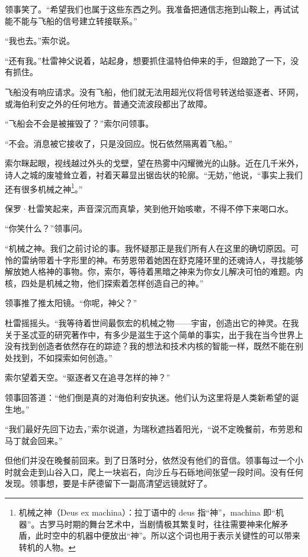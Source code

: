 \documentclass[AutoFakeBold=true]{book}
\begin{document}
领事笑了。``希望我们也属于这些东西之列。我准备把通信志拖到山鞍上，再试试能不能与飞船的信号建立转接联系。''

``我也去。''索尔说。

``还有我。''杜雷神父说着，站起身，想要抓住温特伯伸来的手，但踉跄了一下，没有抓住。

\vspace*{1em}

飞船没有响应请求。没有飞船，他们就无法用超光仪将信号转送给驱逐者、环网，或海伯利安之外的任何地方。普通交流波段都出了故障。

``飞船会不会是被摧毁了？''索尔问领事。

``不会。消息被它接收了，只是没回应。悦石依然隔离着飞船。''

索尔眯起眼，视线越过外头的戈壁，望在热雾中闪耀微光的山脉。近在几千米外，诗人之城的废墟耸立着，衬着天幕显出锯齿状的轮廓。``无妨，''他说，``事实上我们还有很多{\kaishu 机械之神}\footnote{机械之神（Deus ex machina）：拉丁语中的 deus 指``神''，machina 即``机器''。古罗马时期的舞台艺术中，当剧情极其繁复时，往往需要神来化解矛盾，此时空中的机器中便放出``神''。所以这个词也用于表示关键性的可以带来转机的人物。}。''

保罗·杜雷笑起来，声音深沉而真挚，笑到他开始咳嗽，不得不停下来喝口水。

``你笑什么？''领事问。

``{\kaishu 机械之神}。我们之前讨论的事。我怀疑那正是我们所有人在这里的确切原因。可怜的雷纳带着十字形里的神。布劳恩带着她困在舒克隆环里的还魂诗人，寻找能够解放她人格神的事物。你，索尔，等待着黑暗之神来为你女儿解决可怕的难题。内核，四处是机械之物，他们探索着怎样创造自己的神。''

领事推了推太阳镜。``你呢，神父？''

杜雷摇摇头。``我等待着世间最恢宏的机械之物——宇宙，创造出它的神灵。在我关于圣忒亚的研究著作中，有多少是滋生于这个简单的事实，出于我在当今世界上没有找到创造者依然存在的踪迹？我的想法和技术内核的智能一样，既然不能在别处找到，不如探索如何创造。''

索尔望着天空。``驱逐者又在追寻怎样的神？''

领事回答道：``他们倒是真的对海伯利安执迷。他们认为这里将是人类新希望的诞生地。''

``我们最好先回下边去，''索尔说道，为瑞秋遮挡着阳光，``说不定晚餐前，布劳恩和马丁就会回来。''

但他们并没在晚餐前回来。到了日落时分，依然没有他们的音信。领事每过一个小时就会走到山谷入口，爬上一块岩石，向沙丘与石砾地间张望一段时间。没有任何发现。领事想，要是卡萨德留下一副高清望远镜就好了。
\end{document}
